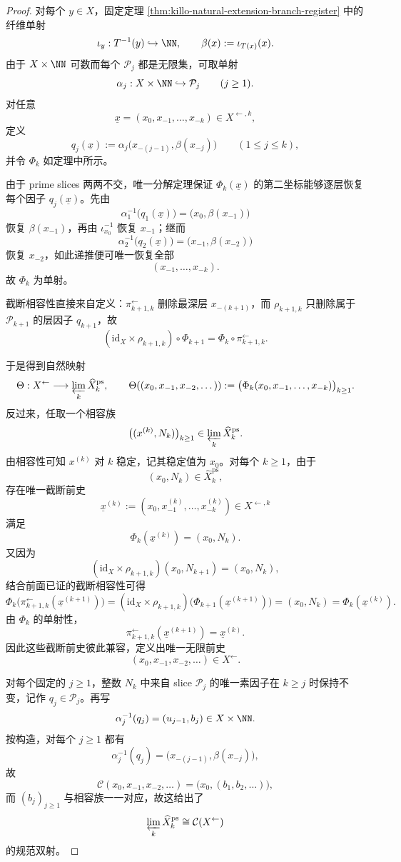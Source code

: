 \begin{proof}
对每个 \(y\in X\)，固定定理 \ref{thm:killo-natural-extension-branch-register} 中的纤维单射
\[
\iota_y:T^{-1}(y)\hookrightarrow \NN,
\qquad
\beta(x):=\iota_{T(x)}(x).
\]
由于 \(X\times \NN\) 可数而每个 \(\mathcal P_j\) 都是无限集，可取单射
\[
\alpha_j:X\times \NN\hookrightarrow \mathcal P_j
\qquad (j\ge 1).
\]
对任意
\[
\underline x=(x_0,x_{-1},\dots,x_{-k})\in X^{\leftarrow,k},
\]
定义
\[
q_j(\underline x)
:=
\alpha_j\bigl(x_{-(j-1)},\beta(x_{-j})\bigr)
\qquad (1\le j\le k),
\]
并令 \(\Phi_k\) 如定理中所示。

由于 prime slices 两两不交，唯一分解定理保证 \(\Phi_k(\underline x)\) 的第二坐标能够逐层恢复每个因子 \(q_j(\underline x)\)。先由
\[
\alpha_1^{-1}\bigl(q_1(\underline x)\bigr)
=
\bigl(x_0,\beta(x_{-1})\bigr)
\]
恢复 \(\beta(x_{-1})\)，再由 \(\iota_{x_0}^{-1}\) 恢复 \(x_{-1}\)；继而
\[
\alpha_2^{-1}\bigl(q_2(\underline x)\bigr)
=
\bigl(x_{-1},\beta(x_{-2})\bigr)
\]
恢复 \(x_{-2}\)，如此递推便可唯一恢复全部
\[
(x_{-1},\dots,x_{-k}).
\]
故 \(\Phi_k\) 为单射。

截断相容性直接来自定义：\(\pi_{k+1,k}^{\leftarrow}\) 删除最深层 \(x_{-(k+1)}\)，而 \(\rho_{k+1,k}\) 只删除属于 \(\mathcal P_{k+1}\) 的层因子 \(q_{k+1}\)，故
\[
(\mathrm{id}_X\times \rho_{k+1,k})\circ \Phi_{k+1}
=
\Phi_k\circ \pi_{k+1,k}^{\leftarrow}.
\]

于是得到自然映射
\[
\Theta:X^{\leftarrow}\longrightarrow \varprojlim_k \widehat X_k^{\mathrm{ps}},
\qquad
\Theta((x_0,x_{-1},x_{-2},\dots))
:=
\bigl(\Phi_k(x_0,x_{-1},\dots,x_{-k})\bigr)_{k\ge 1}.
\]
反过来，任取一个相容族
\[
\bigl((x^{(k)},N_k)\bigr)_{k\ge 1}\in \varprojlim_k \widehat X_k^{\mathrm{ps}}.
\]
由相容性可知 \(x^{(k)}\) 对 \(k\) 稳定，记其稳定值为 \(x_0\)。对每个 \(k\ge 1\)，由于
\[
(x_0,N_k)\in \widehat X_k^{\mathrm{ps}},
\]
存在唯一截断前史
\[
\underline x^{(k)}
:=
(x_0,x_{-1}^{(k)},\dots,x_{-k}^{(k)})\in X^{\leftarrow,k}
\]
满足
\[
\Phi_k(\underline x^{(k)})=(x_0,N_k).
\]
又因为
\[
(\mathrm{id}_X\times \rho_{k+1,k})(x_0,N_{k+1})=(x_0,N_k),
\]
结合前面已证的截断相容性可得
\[
\Phi_k\bigl(\pi_{k+1,k}^{\leftarrow}(\underline x^{(k+1)})\bigr)
=
(\mathrm{id}_X\times \rho_{k+1,k})\bigl(\Phi_{k+1}(\underline x^{(k+1)})\bigr)
=
(x_0,N_k)
=
\Phi_k(\underline x^{(k)}).
\]
由 \(\Phi_k\) 的单射性，
\[
\pi_{k+1,k}^{\leftarrow}(\underline x^{(k+1)})=\underline x^{(k)}.
\]
因此这些截断前史彼此兼容，定义出唯一无限前史
\[
(x_0,x_{-1},x_{-2},\dots)\in X^{\leftarrow}.
\]

对每个固定的 \(j\ge 1\)，整数 \(N_k\) 中来自 slice \(\mathcal P_j\) 的唯一素因子在 \(k\ge j\) 时保持不变，记作 \(q_j\in \mathcal P_j\)。再写
\[
\alpha_j^{-1}(q_j)=(u_{j-1},b_j)\in X\times \NN.
\]
按构造，对每个 \(j\ge 1\) 都有
\[
\alpha_j^{-1}(q_j)=\bigl(x_{-(j-1)},\beta(x_{-j})\bigr),
\]
故
\[
\mathcal C(x_0,x_{-1},x_{-2},\dots)
=
\bigl(x_0,(b_1,b_2,\dots)\bigr),
\]
而 \((b_j)_{j\ge 1}\) 与相容族一一对应，故这给出了
\[
\varprojlim_k \widehat X_k^{\mathrm{ps}}
\cong
\mathcal C(X^{\leftarrow})
\]
的规范双射。


\end{proof}

